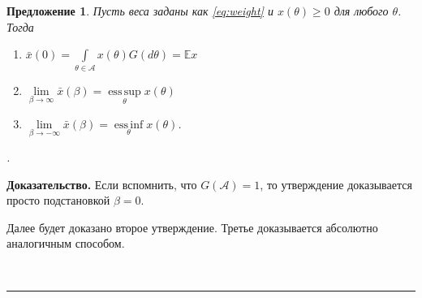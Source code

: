 \documentclass[12pt]{article}
\newtheorem{proposition}{Предложение}
\newenvironment{proof}[1][Доказательство]{\noindent\textbf{#1.} }{\ \rule{0.5em}{0.5em}}
\DeclareMathOperator*{\esssup}{ess\,sup}
\DeclareMathOperator*{\essinf}{ess\,inf}
\begin{document}
\begin{proposition}
Пусть веса заданы как \eqref{eq:weight} и $x(\theta) \geq 0$ для любого $\theta$.  Тогда 
\begin{enumerate}
\item $\bar{x}(0) = \int\limits_{\theta \in \mathcal{A}}x(\theta)G(d \theta) = \mathbb{E} x$
\item $\lim\limits_{\beta \to\infty} \bar{x}(\beta) = \esssup\limits_{\theta} x(\theta)$
\item $\lim\limits_{\beta \to-\infty} \bar{x}(\beta) = \essinf\limits_{\theta} x(\theta)$.
\end{enumerate}.
\end{proposition}
\begin{proof}
Если вспомнить, что $G(\mathcal{A}) = 1$, то утверждение доказывается просто подстановкой $\beta = 0$.

Далее будет доказано второе утверждение.  Третье доказывается абсолютно аналогичным способом.


\end{proof}
\end{document}
